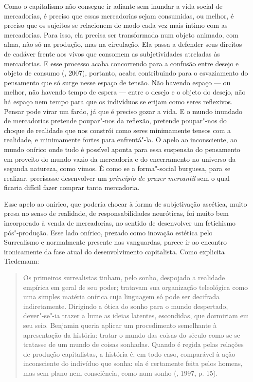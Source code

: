 Como o capitalismo não consegue ir adiante sem inundar a vida social de
mercadorias, é preciso que essas mercadorias sejam consumidas, ou
melhor, é preciso que os sujeitos se relacionem de modo cada vez mais
íntimo com as mercadorias. Para isso, ela precisa ser transformada num
objeto animado, com alma, não só na produção, mas na circulação. Ela
passa a defender seus direitos de cadáver frente aos vivos que consomem
as subjetividades atreladas às mercadorias. E esse processo acaba
concorrendo para a confusão entre desejo e objeto de consumo (,
2007), portanto, acaba contribuindo para o esvaziamento do pensamento
que só surge nesse espaço de tensão. Não havendo espaço --- ou melhor,
não havendo tempo de espera --- entre o desejo e o objeto do desejo, não
há espaço nem tempo para que os indivíduos se erijam como seres
reflexivos. Pensar pode virar um fardo, já que é preciso gozar a vida. E
o mundo inundado de mercadorias pretende poupar"-nos da reflexão,
pretende poupar"-nos do choque de realidade que nos constrói como seres
minimamente tensos com a realidade, e minimamente fortes para
enfrentá"-la. O apelo ao inconsciente, ao mundo onírico onde tudo é
possível aponta para essa suspensão do pensamento em proveito do mundo
vazio da mercadoria e do encerramento no universo da segunda natureza,
como vimos. É como se a forma"-social burguesa, para se
realizar, precisasse desenvolver um \emph{princípio de prazer mercantil}
sem o qual ficaria difícil fazer comprar tanta mercadoria.

Esse apelo ao onírico, que poderia chocar à forma de subjetivação
ascética, muito presa no senso de realidade, de responsabilidades
neuróticas, foi muito bem incorporado à venda de mercadorias, no sentido
de desenvolver um fetichismo pós"-produção. Esse lado onírico, prezado
como inovação estética pelo Surrealismo e normalmente presente nas
vanguardas, parece ir ao encontro ironicamente da fase atual do
desenvolvimento capitalista. Como explicita Tiedemann:

\begin{quote}
Os primeiros surrealistas tinham, pelo sonho, despojado a realidade
empírica em geral de seu poder; tratavam sua organização teleológica
como uma simples matéria onírica cuja linguagem só pode ser decifrada
indiretamente. Dirigindo a ótica do sonho para o mundo despertado,
dever"-se"-ia trazer a lume as ideias latentes, escondidas, que dormiriam
em seu seio. Benjamin queria aplicar um procedimento semelhante à
apresentação da história: tratar o mundo das coisas do século  como
se se tratasse de um mundo de coisas sonhadas. Quando é regida pelas
relações de produção capitalistas, a história é, em todo caso,
comparável à ação inconsciente do indivíduo que sonha: ela é certamente
feita pelos homens, mas sem plano nem consciência, como num sonho
(, 1997, p. 15).
\end{quote}

